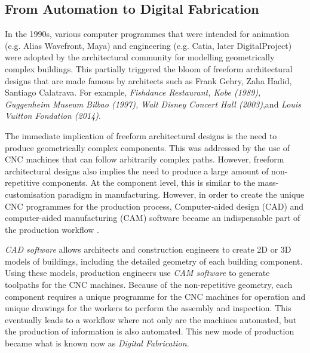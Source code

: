 \subsection{From Automation to Digital Fabrication}
\label{subsection:introduction-from-automation-to-digital-fabrication}

In the 1990s, various computer programmes that were intended for animation (e.g. Alias Wavefront, Maya) and engineering (e.g. Catia, later DigitalProject) were adopted by the architectural community for modelling geometrically complex buildings. This partially triggered the bloom of freeform architectural designs that are made famous by architects such as Frank Gehry, Zaha Hadid, Santiago Calatrava. For example, \textit{Fishdance Restaurant, Kobe (1989),  Guggenheim Museum Bilbao (1997), Walt Disney Concert Hall (2003)},and \textit{ Louis Vuitton Fondation (2014)}.\textit{ }

The immediate implication of freeform architectural designs is the need to produce geometrically complex components. This was addressed by the use of CNC machines that can follow arbitrarily complex paths. However, freeform architectural designs also implies the need to produce a large amount of non-repetitive components. At the component level, this is similar to the mass-customisation paradigm in manufacturing. However, in order to create the unique CNC programmes for the production process, Computer-aided design (CAD) and computer-aided manufacturing (CAM) software became an indispensable part of the production workflow \parencite{sheldenDigitalSurfaceRepresentation2002}. 

\textit{CAD software} allows architects and construction engineers to create 2D or 3D models of buildings, including the detailed geometry of each building component. Using these models, production engineers use \textit{CAM software} to generate toolpaths for the CNC machines. Because of the non-repetitive geometry, each component requires a unique programme for the CNC machines for operation and unique drawings for the workers to perform the assembly and inspection. This eventually leads to a workflow where not only are the machines automated, but the production of information is also automated. This new mode of production became what is known now as \textit{Digital Fabrication}.

